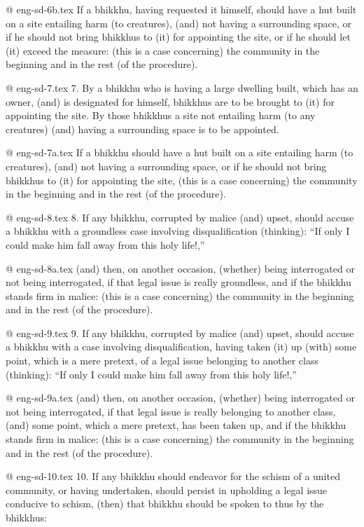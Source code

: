 @ eng-sd-6b.tex
If a bhikkhu, having requested it himself, should have a hut built on a site entailing harm (to creatures), (and) not having a surrounding space, or if he should not bring bhikkhus to (it) for appointing the site, or if he should let (it) exceed the measure: (this is a case concerning) the community in the beginning and in the rest (of the procedure).

@ eng-sd-7.tex
7. By a bhikkhu who is having a large dwelling built, which has an owner, (and) is designated for himself, bhikkhus are to be brought to (it) for appointing the site. By those bhikkhus a site not entailing harm (to any creatures) (and) having a surrounding space is to be appointed.

@ eng-sd-7a.tex
If a bhikkhu should have a hut built on a site entailing harm (to creatures), (and) not having a surrounding space, or if he should not bring bhikkhus to (it) for appointing the site, (this is a case concerning) the community in the beginning and in the rest (of the procedure).

@ eng-sd-8.tex
8. If any bhikkhu, corrupted by malice (and) upset, should accuse a bhikkhu with a groundless case involving disqualification (thinking): “If only I could make him fall away from this holy life!,”

@ eng-sd-8a.tex
(and) then, on another occasion, (whether) being interrogated or not being interrogated, if that legal issue is really groundless, and if the bhikkhu stands firm in malice: (this is a case concerning) the community in the beginning and in the rest (of the procedure).

@ eng-sd-9.tex
9. If any bhikkhu, corrupted by malice (and) upset, should accuse a bhikkhu with a case involving disqualification, having taken (it) up (with) some point, which is a mere pretext, of a legal issue belonging to another class (thinking): “If only I could make him fall away from this holy life!,”

@ eng-sd-9a.tex
(and) then, on another occasion, (whether) being interrogated or not being interrogated, if that legal issue is really belonging to another class, (and) some point, which a mere pretext, has been taken up, and if the bhikkhu stands firm in malice: (this is a case concerning) the community in the beginning and in the rest (of the procedure).

@ eng-sd-10.tex
10. If any bhikkhu should endeavor for the schism of a united community, or having undertaken, should persist in upholding a legal issue conducive to schism, (then) that bhikkhu should be spoken to thus by the bhikkhus:

